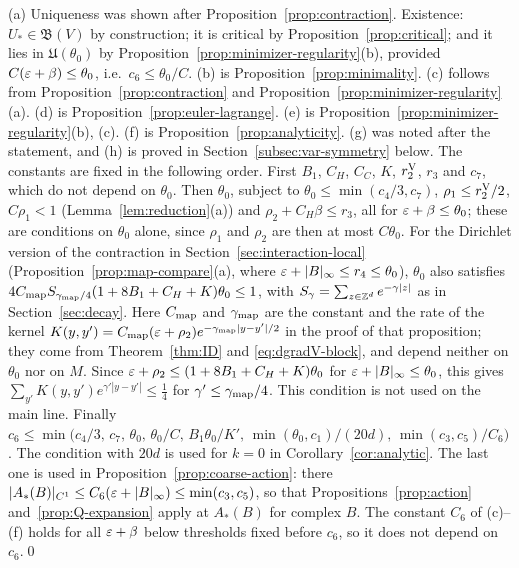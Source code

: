 (a) Uniqueness was shown after Proposition~\ref{prop:contraction}. Existence: $U_*\in\mathfrak B(V)$ by construction; it is critical by Proposition~\ref{prop:critical}; and it lies in $\mathfrak U(\theta_0)$ by Proposition~\ref{prop:minimizer-regularity}(b), provided $C(\varepsilon+\beta)\le\theta_0$, i.e.\ $c_6\le\theta_0/C$. (b) is Proposition~\ref{prop:minimality}. (c) follows from Proposition~\ref{prop:contraction} and Proposition~\ref{prop:minimizer-regularity}(a). (d) is Proposition~\ref{prop:euler-lagrange}. (e) is Proposition~\ref{prop:minimizer-regularity}(b), (c). (f) is Proposition~\ref{prop:analyticity}. (g) was noted after the statement, and (h) is proved in Section~\ref{subsec:var-symmetry} below. The constants are fixed in the following order. First $B_1$, $C_H$, $C_C$, $K$, $r_2^{\rm V}$, $r_3$ and $c_7$, which do not depend on $\theta_0$. Then $\theta_0$, subject to $\theta_0\le\min(c_4/3,c_7)$, $\rho_1\le r_2^{\rm V}/2$, $C\rho_1<1$ (Lemma~\ref{lem:reduction}(a)) and $\rho_2+C_H\beta\le r_3$, all for $\varepsilon+\beta\le\theta_0$; these are conditions on $\theta_0$ alone, since $\rho_1$ and $\rho_2$ are then at most $C\theta_0$. For the Dirichlet version of the contraction in Section~\ref{sec:interaction-local} (Proposition~\ref{prop:map-compare}(a), where $\varepsilon+|B|_\infty\le r_4\le\theta_0$), $\theta_0$ also satisfies $4C_{\rm map}S_{\gamma_{\rm map}/4}(1+8B_1+C_H+K)\theta_0\le1$, with $S_\gamma=\sum_{z\in\mathbb Z^d}e^{-\gamma|z|}$ as in Section~\ref{sec:decay}. Here $C_{\rm map}$ and $\gamma_{\rm map}$ are the constant and the rate of the kernel $K(y,y')=C_{\rm map}(\varepsilon+\rho_2)e^{-\gamma_{\rm map}|y-y'|/2}$ in the proof of that proposition; they come from Theorem~\ref{thm:ID} and \eqref{eq:dgradV-block}, and depend neither on $\theta_0$ nor on $M$. Since $\varepsilon+\rho_2\le(1+8B_1+C_H+K)\theta_0$ for $\varepsilon+|B|_\infty\le\theta_0$, this gives $\sum_{y'}K(y,y')e^{\gamma'|y-y'|}\le\frac14$ for $\gamma'\le\gamma_{\rm map}/4$. This condition is not used on the main line. Finally $c_6\le\min\big(c_4/3,\,c_7,\,\theta_0,\,\theta_0/C,\,B_1\theta_0/K',\,\min(\theta_0,c_1)/(20d),\,\min(c_3,c_5)/C_6\big)$. The condition with $20d$ is used for $k=0$ in Corollary~\ref{cor:analytic}. The last one is used in Proposition~\ref{prop:coarse-action}: there $|A_*(B)|_{C^1}\le C_6(\varepsilon+|B|_\infty)\le\min(c_3,c_5)$, so that Propositions~\ref{prop:action} and~\ref{prop:Q-expansion} apply at $A_*(B)$ for complex $B$. The constant $C_6$ of (c)--(f) holds for all $\varepsilon+\beta$ below thresholds fixed before $c_6$, so it does not depend on $c_6$.\qed

